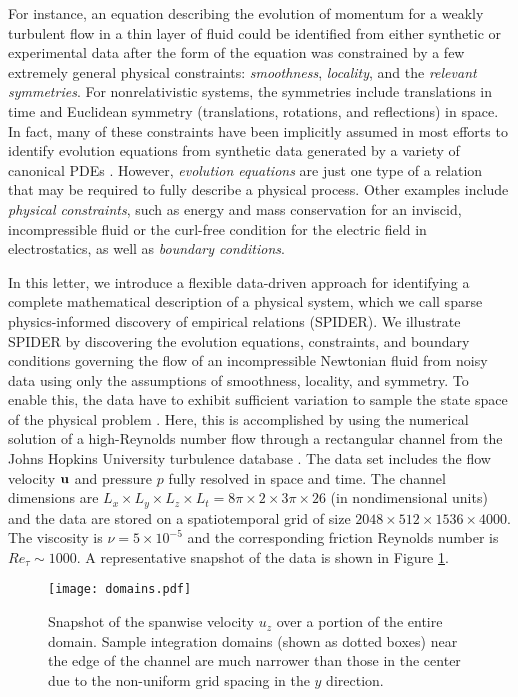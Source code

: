 \documentclass[
 reprint,
 amsmath,amssymb,
 aps,
]{revtex4-2}
\begin{document}
For instance, an equation describing the evolution of momentum for a weakly turbulent flow in a thin layer of fluid could be identified from either synthetic  \cite{reinbold2020} or experimental data \cite{reinbold2021} after the form of the equation was constrained by a few extremely general physical constraints: {\it smoothness}, {\it locality}, and the {\it relevant symmetries}. 
For nonrelativistic systems, the symmetries include translations in time and Euclidean symmetry (translations, rotations, and reflections) in space. In fact, many of these constraints have been implicitly assumed in most efforts to identify evolution equations from synthetic data generated by a variety of canonical PDEs \cite{bar1999,xu2008,rudy2017,schaeffer2017,raissi2018}. However, {\it evolution equations} are just one type of a relation that may be required to fully describe a physical process. Other examples include {\it physical constraints}, such as energy and mass conservation for an inviscid, incompressible fluid or the curl-free condition for the electric field in electrostatics, as well as {\it boundary conditions}. 

In this letter, we introduce a flexible data-driven approach for identifying a complete mathematical description of a physical system, which we call sparse physics-informed discovery of empirical relations (SPIDER). We illustrate SPIDER by discovering the evolution equations, constraints, and boundary conditions governing the flow of an incompressible Newtonian fluid from noisy data using only the assumptions of smoothness, locality, and symmetry. 
To enable this, the data have to exhibit sufficient variation to sample the state space of the physical problem \cite{schaeffer2018}. Here, this is accomplished by using the numerical solution of a high-Reynolds number flow through a rectangular channel from the Johns Hopkins University turbulence database \cite{jhutdb}. The data set includes the flow velocity ${\bf u}$ and pressure $p$ fully resolved in space and time. The channel dimensions are $L_x\times L_y\times L_z\times L_t=8\pi\times 2\times 3\pi\times 26$ (in nondimensional units) and the data are stored on a spatiotemporal grid of size $2048\times 512\times 1536\times 4000$. The viscosity is $\nu=5\times 10^{-5}$ and the corresponding friction Reynolds number is $Re_\tau \sim 1000$. A representative snapshot of the data is shown in Figure \ref{fig:domains}.

\begin{figure}[t]
\centering
\texttt{[image: domains.pdf]}
\caption{Snapshot of the spanwise velocity $u_z$ over a portion of the entire domain. Sample integration domains (shown as dotted boxes) near the edge of the channel are much narrower than those in the center due to the non-uniform grid spacing in the $y$ direction.
}
\label{fig:domains}
\end{figure}
\end{document}
